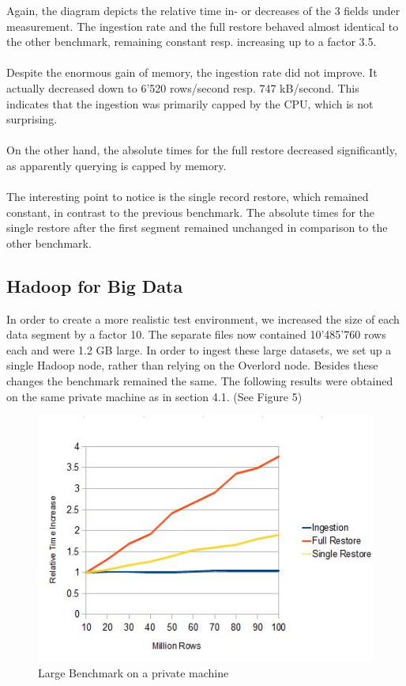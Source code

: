 \documentclass[11pt,singlecolumn]{scrartcl}
\begin{document}
Again, the diagram depicts the relative time in- or decreases of the 3 fields under measurement. The ingestion rate and the full restore behaved almost identical to the other benchmark, remaining constant resp. increasing up to a factor 3.5.\\\\Despite the enormous gain of memory, the ingestion rate did not improve. It actually decreased down to 6'520 rows/second resp. 747 kB/second. This indicates that the ingestion was primarily capped by the CPU, which is not surprising.\\\\On the other hand, the absolute times for the full restore decreased significantly, as apparently querying is capped by memory.\\\\
The interesting point to notice is the single record restore, which remained constant, in contrast to the previous benchmark. The absolute times for the single restore after the first segment remained unchanged in comparison to the other benchmark.


\clearpage
\subsection{Hadoop for Big Data}
In order to create a more realistic test environment, we increased the size of each data segment by a factor 10. The separate files now contained 10'485'760 rows each and were 1.2 GB large. In order to ingest these large datasets, we set up a single Hadoop node, rather than relying on the Overlord node. Besides these changes the benchmark remained the same. The following results were obtained on the same private machine as in section 4.1. (See Figure 5) 

\begin{figure}[h]
\includegraphics[scale=1.1]{100m.jpg}
\caption{Large Benchmark on a private machine}
\end{figure}
\end{document}
